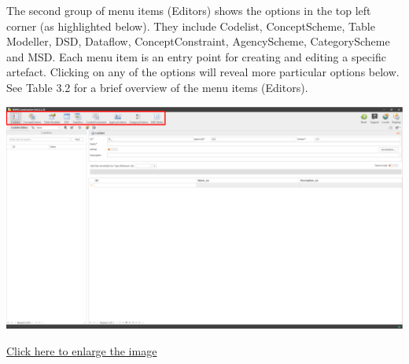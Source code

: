 \documentclass[
]{book}
\begin{document}
The second group of menu items (Editors) shows the options in the top left corner (as highlighted below). They include Codelist, ConceptScheme, Table Modeller, DSD, Dataflow, ConceptConstraint, AgencyScheme, CategoryScheme and MSD. Each menu item is an entry point for creating and editing a specific artefact. Clicking on any of the options will reveal more particular options below. See Table 3.2 for a brief overview of the menu items (Editors).

\begin{center}\includegraphics[width=1\linewidth]{./images/image013} \end{center}

\href{images/image013.png}{Click here to enlarge the image}
\end{document}
